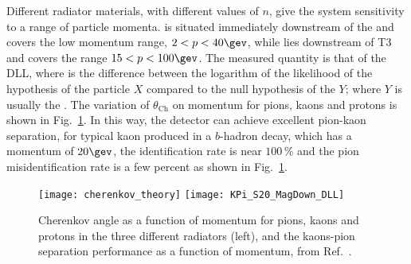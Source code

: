 Different radiator materials, with different values of $n$, give the \rich system sensitivity to a
range of particle momenta.
\richone is situated immediately downstream of the \velo and covers the low momentum range,
$2<p<40\gev$, while \richtwo lies downstream of T3 and covers the range $15<p<100\gev$.
The measured quantity is that of the \gls{DLL}, where \dllxy is the difference between the
logarithm of the likelihood of the hypothesis of the particle $X$ compared to the null hypothesis of the
$Y$; where $Y$ is usually the \pion.
The variation of $\theta_\mathrm{Ch}$ on momentum for pions, kaons and protons is shown in
Fig.~\ref{fig:lhcb:pideff}.
In this way, the \lhcb detector can achieve excellent pion-kaon separation, for typical kaon
produced in a $b$-hadron decay, which has a
momentum of \approx$20\gev$, the identification rate is near $100\,\%$ and the pion misidentification
rate is a few percent as shown in Fig.~\ref{fig:lhcb:pideff}.

\begin{figure}
  \begin{center}
    \texttt{[image: cherenkov\_theory]}
    \texttt{[image: KPi\_S20\_MagDown\_DLL]}
  \end{center}
  \caption[Particle identification and Cherenkov angles]
  {
    Cherenkov angle as a function of momentum for pions, kaons and protons in the three different
    radiators (left), and the kaons-pion separation performance as a function of momentum, from
    Ref.~\cite{LHCb-DP-2012-003}.
  }
  \label{fig:lhcb:pideff}
\end{figure}




